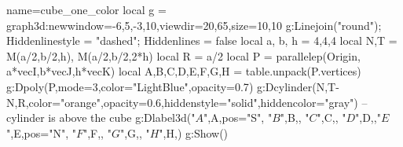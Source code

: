 \documentclass[12pt]{article}
\begin{document}
\begin{luadraw}{name=cube_one_color}
local g = graph3d:new{window={-6,5,-3,10},viewdir={20,65},size={10,10}}
g:Linejoin("round"); Hiddenlinestyle = "dashed"; Hiddenlines = false
local a, b, h = 4,4,4
local N,T = M(a/2,b/2,h), M(a/2,b/2,2*h)
local R = a/2
local P = parallelep(Origin, a*vecI,b*vecJ,h*vecK)
local A,B,C,D,E,F,G,H = table.unpack(P.vertices)
g:Dpoly(P,{mode=3,color="LightBlue",opacity=0.7})
g:Dcylinder(N,T-N,R,{color="orange",opacity=0.6,hiddenstyle="solid",hiddencolor="gray"}) -- cylinder is above the cube
g:Dlabel3d("$A$",A,{pos="S"}, "$B$",B,{}, "$C$",C,{}, "$D$",D,{},"$E$",E,{pos="N"}, "$F$",F,{}, "$G$",G,{}, "$H$",H,{})
g:Show()
\end{luadraw}
\end{document}

